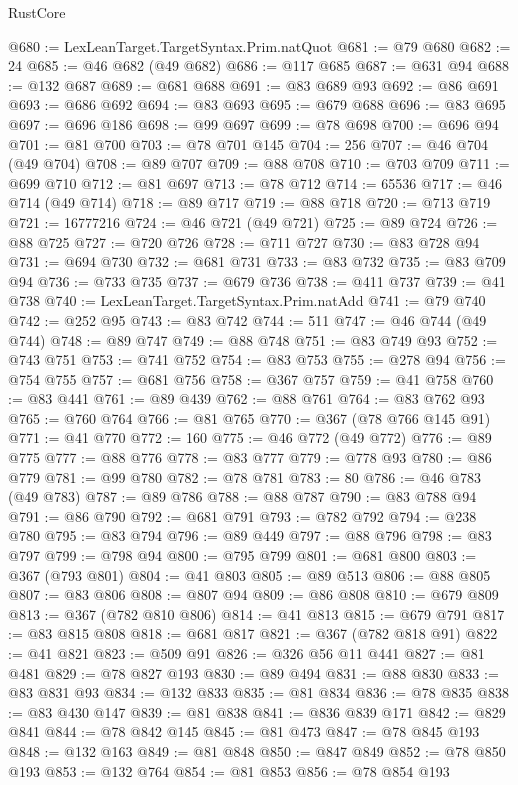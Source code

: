 \begin{lexlean}{RustCore}
\begin{coremodule}
@680 := LexLeanTarget.TargetSyntax.Prim.natQuot
@681 := @79 @680
@682 := 24
@685 := @46 @682 (@49 @682)
@686 := @117 @685
@687 := @631 @94
@688 := @132 @687
@689 := @681 @688
@691 := @83 @689 @93
@692 := @86 @691
@693 := @686 @692
@694 := @83 @693
@695 := @679 @688
@696 := @83 @695
@697 := @696 @186
@698 := @99 @697
@699 := @78 @698
@700 := @696 @94
@701 := @81 @700
@703 := @78 @701 @145
@704 := 256
@707 := @46 @704 (@49 @704)
@708 := @89 @707
@709 := @88 @708
@710 := @703 @709
@711 := @699 @710
@712 := @81 @697
@713 := @78 @712
@714 := 65536
@717 := @46 @714 (@49 @714)
@718 := @89 @717
@719 := @88 @718
@720 := @713 @719
@721 := 16777216
@724 := @46 @721 (@49 @721)
@725 := @89 @724
@726 := @88 @725
@727 := @720 @726
@728 := @711 @727
@730 := @83 @728 @94
@731 := @694 @730
@732 := @681 @731
@733 := @83 @732
@735 := @83 @709 @94
@736 := @733 @735
@737 := @679 @736
@738 := @411 @737
@739 := @41 @738
@740 := LexLeanTarget.TargetSyntax.Prim.natAdd
@741 := @79 @740
@742 := @252 @95
@743 := @83 @742
@744 := 511
@747 := @46 @744 (@49 @744)
@748 := @89 @747
@749 := @88 @748
@751 := @83 @749 @93
@752 := @743 @751
@753 := @741 @752
@754 := @83 @753
@755 := @278 @94
@756 := @754 @755
@757 := @681 @756
@758 := @367 @757
@759 := @41 @758
@760 := @83 @441
@761 := @89 @439
@762 := @88 @761
@764 := @83 @762 @93
@765 := @760 @764
@766 := @81 @765
@770 := @367 (@78 @766 @145 @91)
@771 := @41 @770
@772 := 160
@775 := @46 @772 (@49 @772)
@776 := @89 @775
@777 := @88 @776
@778 := @83 @777
@779 := @778 @93
@780 := @86 @779
@781 := @99 @780
@782 := @78 @781
@783 := 80
@786 := @46 @783 (@49 @783)
@787 := @89 @786
@788 := @88 @787
@790 := @83 @788 @94
@791 := @86 @790
@792 := @681 @791
@793 := @782 @792
@794 := @238 @780
@795 := @83 @794
@796 := @89 @449
@797 := @88 @796
@798 := @83 @797
@799 := @798 @94
@800 := @795 @799
@801 := @681 @800
@803 := @367 (@793 @801)
@804 := @41 @803
@805 := @89 @513
@806 := @88 @805
@807 := @83 @806
@808 := @807 @94
@809 := @86 @808
@810 := @679 @809
@813 := @367 (@782 @810 @806)
@814 := @41 @813
@815 := @679 @791
@817 := @83 @815 @808
@818 := @681 @817
@821 := @367 (@782 @818 @91)
@822 := @41 @821
@823 := @509 @91
@826 := @326 @56 @11 @441
@827 := @81 @481
@829 := @78 @827 @193
@830 := @89 @494
@831 := @88 @830
@833 := @83 @831 @93
@834 := @132 @833
@835 := @81 @834
@836 := @78 @835
@838 := @83 @430 @147
@839 := @81 @838
@841 := @836 @839 @171
@842 := @829 @841
@844 := @78 @842 @145
@845 := @81 @473
@847 := @78 @845 @193
@848 := @132 @163
@849 := @81 @848
@850 := @847 @849
@852 := @78 @850 @193
@853 := @132 @764
@854 := @81 @853
@856 := @78 @854 @193

\end{coremodule}
\end{lexlean}
